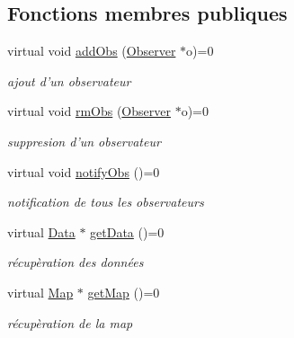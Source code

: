 \subsection*{Fonctions membres publiques}
\begin{DoxyCompactItemize}
\item 
\hypertarget{classSubject_a4a12fdee2e95909a575066103986fa85}{virtual void \hyperlink{classSubject_a4a12fdee2e95909a575066103986fa85}{add\+Obs} (\hyperlink{classObserver}{Observer} $\ast$o)=0}\label{classSubject_a4a12fdee2e95909a575066103986fa85}

\begin{DoxyCompactList}\small\item\em ajout d'un observateur \end{DoxyCompactList}\item 
\hypertarget{classSubject_a1005f6c36e1a65fb13f1f0fa908b82e0}{virtual void \hyperlink{classSubject_a1005f6c36e1a65fb13f1f0fa908b82e0}{rm\+Obs} (\hyperlink{classObserver}{Observer} $\ast$o)=0}\label{classSubject_a1005f6c36e1a65fb13f1f0fa908b82e0}

\begin{DoxyCompactList}\small\item\em suppresion d'un observateur \end{DoxyCompactList}\item 
\hypertarget{classSubject_a421d620f3f93365bfd57cd1e9165e501}{virtual void \hyperlink{classSubject_a421d620f3f93365bfd57cd1e9165e501}{notify\+Obs} ()=0}\label{classSubject_a421d620f3f93365bfd57cd1e9165e501}

\begin{DoxyCompactList}\small\item\em notification de tous les observateurs \end{DoxyCompactList}\item 
\hypertarget{classSubject_ab847f18f48b243cf2104d7b8bc4fdb62}{virtual \hyperlink{classData}{Data} $\ast$ \hyperlink{classSubject_ab847f18f48b243cf2104d7b8bc4fdb62}{get\+Data} ()=0}\label{classSubject_ab847f18f48b243cf2104d7b8bc4fdb62}

\begin{DoxyCompactList}\small\item\em récupèration des données \end{DoxyCompactList}\item 
\hypertarget{classSubject_ac5639945604c72dc64e4a173bf60a516}{virtual \hyperlink{classMap}{Map} $\ast$ \hyperlink{classSubject_ac5639945604c72dc64e4a173bf60a516}{get\+Map} ()=0}\label{classSubject_ac5639945604c72dc64e4a173bf60a516}

\begin{DoxyCompactList}\small\item\em récupèration de la map \end{DoxyCompactList}\end{DoxyCompactItemize}


